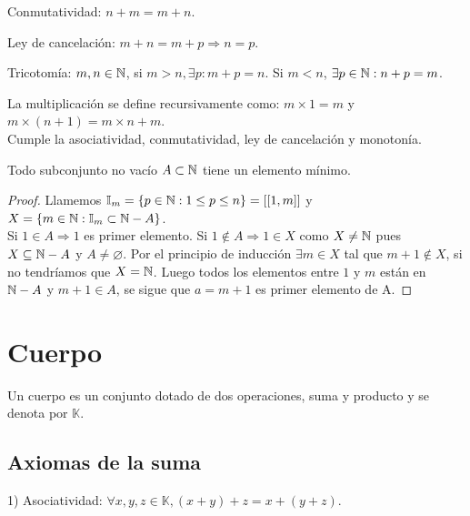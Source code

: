 \begin{prop}
    Conmutatividad: $n+m = m+n$.
\end{prop}

\begin{prop}
    Ley de cancelación: $m+n = m+p \Rightarrow n=p$.
\end{prop}

\begin{prop}
    Tricotomía: $m,n \in \mathbb{N}$, si $m > n, \exists p:m+p=n$. Si $m < n$,  $\exists p \in \mathbb{N} :n+p=m$.
\end{prop}

\begin{definition}
    La multiplicación se define recursivamente como: $m \times 1 =m$ y $m \times (n+1) = m \times n + m$. \\
    Cumple la asociatividad, conmutatividad, ley de cancelación y monotonía.
\end{definition}

\begin{theorem}
    Todo subconjunto no vacío $A \subset \mathbb{N}$ tiene un elemento mínimo.
    \begin{proof}
        Llamemos $\mathbb{I}_m = \{ p \in \mathbb{N} : 1 \leq p \leq n \} = [[ 1, m ]]$ y $X = \{ m \in \mathbb{N} : \mathbb{I}_m \subset \mathbb{N} - A \}$. \\
        Si $1 \in A \Rightarrow 1$ es primer elemento.
        Si $1 \notin A \Rightarrow 1 \in X$ como $X \neq \mathbb{N}$ pues $X \subseteq \mathbb{N} - A$ y $A \neq \varnothing$.
        Por el principio de inducción $\exists m \in X$ tal que $m+1 \notin X$, si no tendríamos que $X = \mathbb{N}$. Luego todos los elementos entre $1$ y $m$ están en $\mathbb{N} - A$ y $m+1 \in A$, se sigue que $a = m+1$ es primer elemento de A.
    \end{proof}
\end{theorem}


\section{Cuerpo}

Un cuerpo es un conjunto dotado de dos operaciones, suma y producto y se denota por $\mathbb{K}$.

\subsection{Axiomas de la suma}

1) Asociatividad: $\forall x,y,z \in \mathbb{K}, (x+y)+z=x+(y+z)$.

